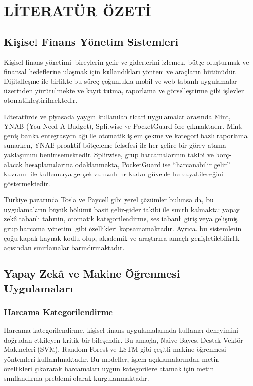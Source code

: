 \chapter{LİTERATÜR ÖZETİ}

\section{Kişisel Finans Yönetim Sistemleri}

Kişisel finans yönetimi, bireylerin gelir ve giderlerini izlemek, bütçe oluşturmak ve finansal hedeflerine ulaşmak için kullandıkları yöntem ve araçların bütünüdür. Dijitalleşme ile birlikte bu süreç çoğunlukla mobil ve web tabanlı uygulamalar üzerinden yürütülmekte ve kayıt tutma, raporlama ve görselleştirme gibi işlevler otomatikleştirilmektedir.

Literatürde ve piyasada yaygın kullanılan ticari uygulamalar arasında Mint, YNAB (You Need A Budget), Splitwise ve PocketGuard öne çıkmaktadır. Mint, geniş banka entegrasyon ağı ile otomatik işlem çekme ve kategori bazlı raporlama sunarken, YNAB proaktif bütçeleme felsefesi ile her gelire bir görev atama yaklaşımını benimsemektedir. Splitwise, grup harcamalarının takibi ve borç-alacak hesaplamalarına odaklanmakta, PocketGuard ise ``harcanabilir gelir'' kavramı ile kullanıcıya gerçek zamanlı ne kadar güvenle harcayabileceğini göstermektedir.

Türkiye pazarında Tosla ve Paycell gibi yerel çözümler bulunsa da, bu uygulamaların büyük bölümü basit gelir-gider takibi ile sınırlı kalmakta; yapay zekâ tabanlı tahmin, otomatik kategorilendirme, ses tabanlı giriş veya gelişmiş grup harcama yönetimi gibi özellikleri kapsamamaktadır. Ayrıca, bu sistemlerin çoğu kapalı kaynak kodlu olup, akademik ve araştırma amaçlı genişletilebilirlik açısından sınırlamalar barındırmaktadır.

\section{Yapay Zekâ ve Makine Öğrenmesi Uygulamaları}

\subsection{Harcama Kategorilendirme}

Harcama kategorilendirme, kişisel finans uygulamalarında kullanıcı deneyimini doğrudan etkileyen kritik bir bileşendir. Bu amaçla, Naive Bayes, Destek Vektör Makineleri (SVM), Random Forest ve LSTM gibi çeşitli makine öğrenmesi yöntemleri kullanılmaktadır. Bu modeller, işlem açıklamalarından metin özellikleri çıkararak harcamaları uygun kategorilere atamak için metin sınıflandırma problemi olarak kurgulanmaktadır.

